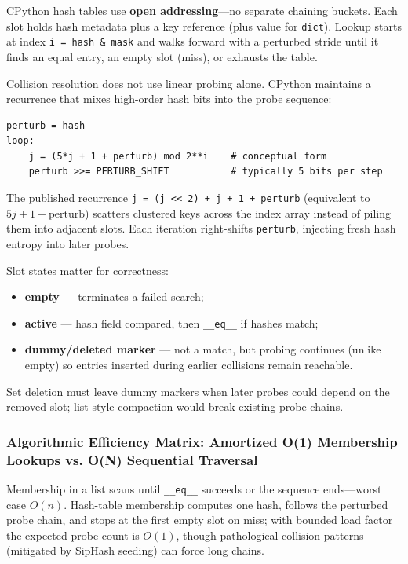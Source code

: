 \documentclass[a4paper,twoside]{report}
\begin{document}
CPython hash tables use \textbf{open addressing}---no separate chaining buckets. Each slot holds hash metadata plus a key reference (plus value for \texttt{dict}). Lookup starts at index \texttt{i = hash \& mask} and walks forward with a perturbed stride until it finds an equal entry, an empty slot (miss), or exhausts the table.

Collision resolution does not use linear probing alone. CPython maintains a recurrence that mixes high-order hash bits into the probe sequence:

\begin{verbatim}
perturb = hash
loop:
    j = (5*j + 1 + perturb) mod 2**i    # conceptual form
    perturb >>= PERTURB_SHIFT           # typically 5 bits per step
\end{verbatim}

The published recurrence \texttt{j = (j << 2) + j + 1 + perturb} (equivalent to $5j + 1 + \text{perturb}$) scatters clustered keys across the index array instead of piling them into adjacent slots. Each iteration right-shifts \texttt{perturb}, injecting fresh hash entropy into later probes.

Slot states matter for correctness:

\begin{itemize}
    \item \textbf{empty} --- terminates a failed search;
    \item \textbf{active} --- hash field compared, then \texttt{\_\_eq\_\_} if hashes match;
    \item \textbf{dummy/deleted marker} --- not a match, but probing continues (unlike empty) so entries inserted during earlier collisions remain reachable.
\end{itemize}

Set deletion must leave dummy markers when later probes could depend on the removed slot; list-style compaction would break existing probe chains.

\subsubsection{Algorithmic Efficiency Matrix: Amortized O(1) Membership Lookups vs. O(N) Sequential Traversal}

Membership in a list scans until \texttt{\_\_eq\_\_} succeeds or the sequence ends---worst case $O(n)$. Hash-table membership computes one hash, follows the perturbed probe chain, and stops at the first empty slot on miss; with bounded load factor the expected probe count is $O(1)$, though pathological collision patterns (mitigated by SipHash seeding) can force long chains.
\end{document}
